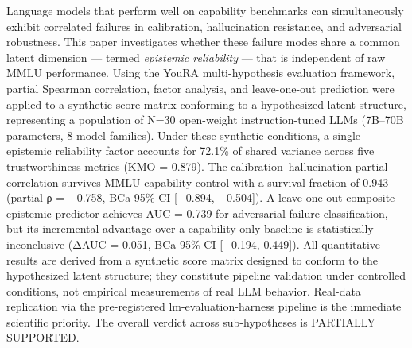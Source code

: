 
Language models that perform well on capability benchmarks can simultaneously exhibit correlated failures in calibration, hallucination resistance, and adversarial robustness. This paper investigates whether these failure modes share a common latent dimension — termed \textit{epistemic reliability} — that is independent of raw MMLU performance. Using the YouRA multi-hypothesis evaluation framework, partial Spearman correlation, factor analysis, and leave-one-out prediction were applied to a synthetic score matrix conforming to a hypothesized latent structure, representing a population of N=30 open-weight instruction-tuned LLMs (7B–70B parameters, 8 model families). Under these synthetic conditions, a single epistemic reliability factor accounts for 72.1\% of shared variance across five trustworthiness metrics (KMO = 0.879). The calibration–hallucination partial correlation survives MMLU capability control with a survival fraction of 0.943 (partial ρ = −0.758, BCa 95\% CI [−0.894, −0.504]). A leave-one-out composite epistemic predictor achieves AUC = 0.739 for adversarial failure classification, but its incremental advantage over a capability-only baseline is statistically inconclusive (ΔAUC = 0.051, BCa 95\% CI [−0.194, 0.449]). All quantitative results are derived from a synthetic score matrix designed to conform to the hypothesized latent structure; they constitute pipeline validation under controlled conditions, not empirical measurements of real LLM behavior. Real-data replication via the pre-registered lm-evaluation-harness pipeline is the immediate scientific priority. The overall verdict across sub-hypotheses is PARTIALLY SUPPORTED.

